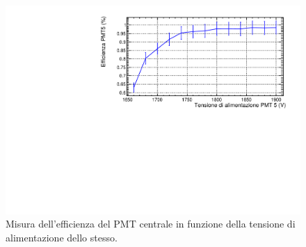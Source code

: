 \documentclass[a4paper,10pt]{article}
\begin{document}
\begin{figure}
	\centering
	\includegraphics[width=\textwidth]{fig/efficiency}
	\caption{Misura dell'efficienza del PMT centrale in funzione della tensione di alimentazione dello stesso.}
	\label{fig:efficiency}
\end{figure}

\label{sec:efficienza} 


\end{document}
